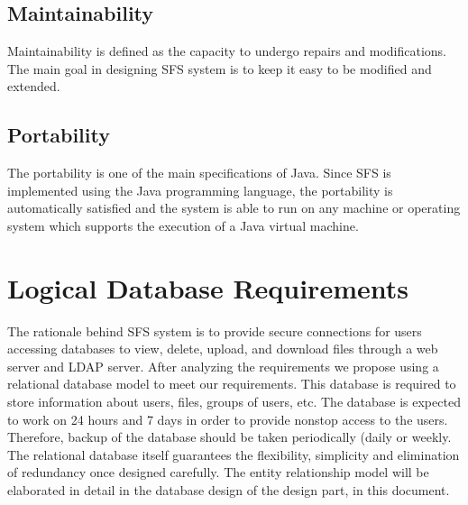 \subsection{Maintainability}

Maintainability is defined as the capacity to undergo repairs and
modifications. The main goal in designing SFS system is to keep it
easy to be modified and extended.

\subsection{Portability}

The portability is one of the main specifications of Java. Since SFS
is implemented using the Java programming language, the portability
is automatically satisfied and the system is able to run on any
machine or operating system which supports the execution of a Java
virtual machine.

\section{Logical Database Requirements}

The rationale behind SFS system is to provide secure connections for
users accessing databases to view, delete, upload, and download
files through a web server and LDAP server. After analyzing the
requirements we propose using a relational database model to meet
our requirements. This database is required to store information
about users, files, groups of users, etc.  The database is expected
to work on 24 hours and 7 days in order to provide nonstop access to
the users. Therefore, backup of the database should be taken
periodically (daily or weekly. The relational database itself
guarantees the flexibility, simplicity and elimination of redundancy
once designed carefully. The entity relationship model will be
elaborated in detail in the database design of the design part, in
this document.

